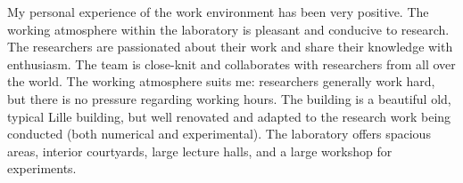 \newpage
My personal experience of the work environment has been very positive.
The working atmosphere within the laboratory is pleasant and conducive to research. The researchers are passionated about their work and share their knowledge with enthusiasm. The team is close-knit and collaborates with researchers from all over the world.
The working atmosphere suits me: researchers generally work hard, but there is no pressure regarding working hours.
The building is a beautiful old, typical Lille building, but well renovated and adapted to the research work being conducted (both numerical and experimental).
The laboratory offers spacious areas, interior courtyards, large lecture halls, and a large workshop for experiments.